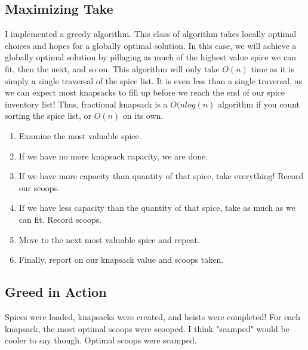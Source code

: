 \documentclass[letterpaper, 10pt]{article}
\begin{document}
\subsection{Maximizing Take}
I implemented a greedy algorithm. This class of algorithm takes locally optimal choices and hopes for a globally optimal solution. In this case, we will achieve a globally optimal solution by pillaging as much of the highest value spice we can fit, then the next, and so on. This algorithm will only take $O(n)$ time as it is simply a single traversal of the spice list. It is even less than a single traversal, as we can expect most knapsacks to fill up before we reach the end of our spice inventory list! Thus, fractional knapsack is a $O(nlog(n)$ algorithm if you count sorting the spice list, or $O(n)$ on its own.
\begin{enumerate}
    \item Examine the most valuable spice.
    \item If we have no more knapsack capacity, we are done.
    \item If we have more capacity than quantity of that spice, take everything! Record our scoops.
    \item If we have less capacity than the quantity of that spice, take as much as we can fit. Record scoops.
    \item Move to the next most valuable spice and repeat.
    \item Finally, report on our knapsack value and scoops taken.
\end{enumerate}
\vspace{-3pt}


\subsection{Greed in Action}
Spices were loaded, knapsacks were created, and heists were completed! For each knapsack, the most optimal scoops were scooped. I think "scamped" would be cooler to say though. Optimal scoops were scamped.

\end{document}
